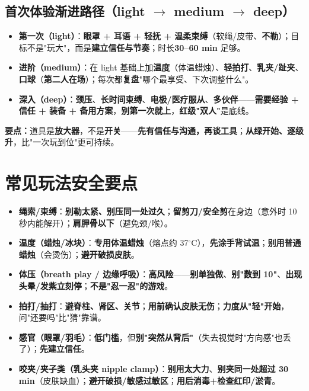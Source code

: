 \documentclass[12pt,UTF8,openany]{ctexbook}
\begin{document}
\subsection*{首次体验渐进路径（light $\to$ medium $\to$ deep）}
\begin{itemize}[leftmargin=2em,itemsep=0.3em]
  \item \textbf{第一次（light）}：\textbf{眼罩 + 耳语 + 轻抚 + 温柔束缚}（软绳/皮带、\textbf{不勒}）；目标不是"玩大"，而是\textbf{建立信任与节奏}；时长\textbf{30--60 min} 足够。
  \item \textbf{进阶（medium）}：在 light 基础上加\textbf{温度}（体温蜡烛）、\textbf{轻拍打}、\textbf{乳夹/趾夹}、\textbf{口球}（\textbf{第二人在场}）；每次都\textbf{复盘}"哪个最享受、下次调整什么"。
  \item \textbf{深入（deep）}：\textbf{颈压}、\textbf{长时间束缚}、\textbf{电极/医疗服从}、\textbf{多伙伴}——\textbf{需要经验 + 信任 + 装备 + 备用方案}，\textbf{别第一次就上}，\textbf{红级"双人"}是底线。
\end{itemize}

\noindent\textbf{要点：}道具是\textbf{放大器}，不是\textbf{开关}——\textbf{先有信任与沟通，再谈工具}；\textbf{从绿开始、逐级升}，比"一次玩到位"更可持续。

\section{常见玩法安全要点}
\begin{itemize}[leftmargin=2em,itemsep=0.3em]
  \item \textbf{绳索/束缚}：\textbf{别勒太紧、别压同一处过久}；\textbf{留剪刀/安全剪}在身边（意外时 10 秒内能解开）；\textbf{肩胛骨以下}（避免颈/喉）。
  \item \textbf{温度（蜡烛/冰块）}：\textbf{专用体温蜡烛}（熔点约 37$^\circ$C），\textbf{先涂手背试温}；\textbf{别用普通蜡烛}（会烫伤）；\textbf{避开破损皮肤}。
  \item \textbf{体压（breath play / 边缘呼吸）}：\textbf{高风险}——\textbf{别单独做}、\textbf{别"数到 10"}、\textbf{出现头晕/发紫立刻停}；\textbf{不是"忍一忍"的游戏}。
  \item \textbf{拍打/抽打}：\textbf{避脊柱、肾区、关节}；\textbf{用前确认皮肤无伤}；\textbf{力度从"轻"开始}，问"还要吗"比"猜"靠谱。
  \item \textbf{感官（眼罩/羽毛）}：\textbf{低门槛}，但\textbf{别"突然从背后"}（失去视觉时"方向感"也丢了）；\textbf{先建立信任}。
  \item \textbf{咬夹/夹子类（乳头夹 nipple clamp）}：\textbf{别用太大力}、\textbf{别夹同一处超过 30\,min}（皮肤缺血）；\textbf{避开破损/敏感过敏区}；\textbf{用后消毒+检查红印/淤青}。
\end{itemize}
\end{document}
